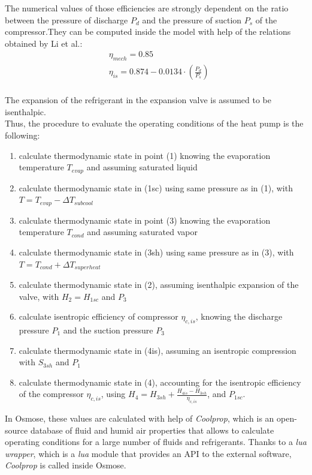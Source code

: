 \documentclass{article}
\begin{document}
The numerical values of those efficiencies are strongly dependent on the ratio between the pressure of discharge $P_{d}$ and the pressure of suction $P_{s}$ of the compressor.They can be computed inside the model with help of the relations obtained by Li et al.\cite{liPerformanceCharacteristicsR1234yf2014}:
\begin{align}
& \eta_{mech} = 0.85\\
& \eta_{is} = 0.874-0.0134\cdot(\frac{P_{d}}{P_{s}})\\
\end{align}
		
The expansion of the refrigerant in the expansion valve is assumed to be isenthalpic.\\ 

Thus, the procedure to evaluate the operating conditions of the heat pump is the following:
\begin{enumerate}
	\item calculate thermodynamic state in point (1) knowing the evaporation temperature $T_{evap}$ and assuming saturated liquid
	\item calculate thermodynamic state in (1sc) using same pressure as in (1), with $T = T_{evap} - \Delta T_{subcool}$
	\item calculate thermodynamic state in point (3) knowing the evaporation temperature $T_{cond}$ and assuming saturated vapor
	\item calculate thermodynamic state in (3sh) using same pressure as in (3), with $T = T_{cond} + \Delta T_{superheat}$
	\item calculate thermodynamic state in (2), assuming isenthalpic expansion of the valve, with $H_{2} = H_{1sc}$ and $P_{3}$
	\item calculate isentropic efficiency of compressor $\eta_{c,is}$, knowing the discharge pressure $P_{1}$ and the suction pressure $P_{3}$
	\item calculate thermodynamic state in (4is), assuming an isentropic compression with $S_{3sh}$ and $P_{1}$
	\item calculate thermodynamic state in (4), accounting for the isentropic efficiency of the compressor $\eta_{c,is}$, using $H_{4} = H_{3sh} + \frac{H_{4is} - H_{3sh}}{\eta_{c,is}}$, and $P_{1sc}$.
\end{enumerate}

In Osmose, these values are calculated with help of \textit{Coolprop}, which is an open-source database of fluid and humid air properties that allows to calculate operating conditions for a large number of fluids and refrigerants. Thanks to a \textit{lua wrapper}, which is a \textit{lua} module that provides an API to the external software, \textit{Coolprop} is called inside Osmose.
\end{document}
